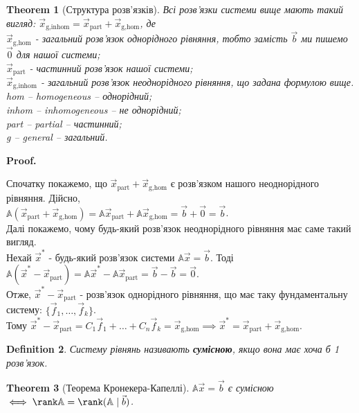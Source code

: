 \documentclass[a4paper, 10pt]{article}
\makeatletter
\theoremstyle{theoremdd}
\newtheorem{theorem}{Theorem}[subsection]
\newtheorem{definition}[theorem]{Definition}
\renewenvironment{proof}[1][Proof.\\]{\par
\pushQED{\hfill \qed}%
\normalfont \topsep6\p@\@plus6\p@\relax
\trivlist
\item\relax
{\bfseries
#1\@addpunct{.}}\hspace\labelsep\ignorespaces
}{%
\popQED\endtrivlist\@endpefalse
}
\makeatother
\begin{document}
\begin{theorem}[Структура розв'язків]
Всі розв'язки системи вище мають такий вигляд: $\vec{x}_{\text{g,inhom}} = \vec{x}_{\text{part}} + \vec{x}_{\text{g,hom}}$, де \\
$\vec{x}_{\text{g,hom}}$ - загальний розв'язок однорідного рівняння, тобто замість $\vec{b}$ ми пишемо $\vec{0}$ для нашої системи;\\
$\vec{x}_{\text{part}}$ - частинний розв'язок нашої системи;\\
$\vec{x}_{\text{g,inhom}}$ - загальний розв'язок неоднорідного рівняння, що задана формулою вище.
\bigskip \\
hom \textit{-- homogeneous -- однорідний};\\
inhom \textit{-- inhomogeneous -- не однорідний};\\
part \textit{-- partial -- частинний};\\
g \textit{-- general -- загальний}.
\end{theorem}

\begin{proof}
Спочатку покажемо, що $\vec{x}_{\text{part}} + \vec{x}_{\text{g,hom}}$ є розв'язком нашого неоднорідного рівняння. Дійсно,\\
$\mathbb{A} (\vec{x}_{\text{part}} + \vec{x}_{\text{g,hom}}) = \mathbb{A} \vec{x}_{\text{part}} + \mathbb{A} \vec{x}_{\text{g,hom}} = \vec{b} + \vec{0} = \vec{b}$.\\
Далі покажемо, чому будь-який розв'язок неоднорідного рівняння має саме такий вигляд.\\
Нехай $\vec{x}^*$ - будь-який розв'язок системи $\mathbb{A} \vec{x} = \vec{b}$. Тоді $\mathbb{A}(\vec{x}^* - \vec{x}_{\text{part}}) = \mathbb{A}\vec{x}^* - \mathbb{A} \vec{x}_{\text{part}} = \vec{b} - \vec{b} = \vec{0}$.\\
Отже, $\vec{x}^* - \vec{x}_{\text{part}}$ - розв'язок однорідного рівняння, що має таку фундаментальну систему: $\{ \vec{f}_1,\dots, \vec{f}_k \}$. \\ Тому
$\vec{x}^* - \vec{x}_{\text{part}} = C_1 \vec{f}_1 + \dots + C_n \vec{f}_k = \vec{x}_{\text{g,hom}} \implies \vec{x}^* = \vec{x}_{\text{part}} + \vec{x}_{\text{g,hom}}$.
\end{proof}

\begin{definition}
Систему рівнянь називають \textbf{сумісною}, якщо вона має хоча б 1 розв'язок.
\end{definition}

\begin{theorem}[Теорема Кронекера-Капеллі]
$\mathbb{A} \vec{x} = \vec{b}$ є сумісною $\iff \rank \mathbb{A} = \rank (\mathbb{A} \mid \vec{b})$.
\end{theorem}
\end{document}
